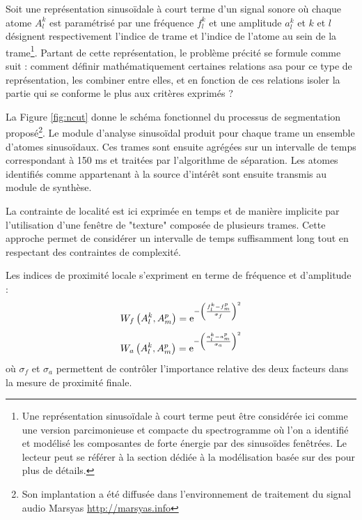 Soit une représentation sinusoïdale à court terme d'un signal sonore où chaque atome $A_l^k$ est paramétrisé par une fréquence $f_l^k$ et une amplitude $a_l^k$ et $k$ et $l$ désignent respectivement l'indice de trame et l'indice de l'atome au sein de la trame\footnote{Une représentation sinusoïdale à court terme peut être considérée ici comme une version parcimonieuse et compacte du spectrogramme où l'on a identifié et modélisé les composantes de forte énergie par des sinusoïdes fenêtrées. Le lecteur peut se référer à la section dédiée à la modélisation basée sur des   pour plus de détails.}. Partant de cette représentation, le problème précité se formule comme suit : comment définir mathématiquement certaines relations asa pour ce type de représentation, les combiner entre elles, et en fonction de ces relations isoler la partie qui se conforme le plus aux critères exprimés ?

La Figure \ref{fig:ncut} donne le schéma fonctionnel du processus de segmentation proposé\footnote{Son implantation a été diffusée dans l'environnement de traitement du signal audio Marsyas \url{http://marsyas.info}}. Le module d'analyse sinusoïdal produit pour chaque trame un ensemble d'atomes sinusoïdaux. Ces trames sont ensuite agrégées sur un intervalle de temps correspondant à 150 ms et traitées par l'algorithme de séparation. Les atomes identifiés comme appartenant à la source d'intérêt sont ensuite transmis au module de synthèse.

La contrainte de localité est ici exprimée en temps et de manière implicite par l'utilisation d'une fenêtre de "texture" composée de plusieurs trames. Cette approche permet de considérer un intervalle de temps suffisamment long tout en respectant des contraintes de complexité.

Les indices de proximité locale s'expriment en terme de fréquence et d'amplitude :
\begin{equation}
  W_f \left( A _ { l } ^ { k } , A _ { m } ^ { p } \right) = \operatorname{e} ^ { - \left( \frac { f _ { l } ^ { k } - f _ { m } ^ { p } } { \sigma _ { f } } \right) ^ { 2 } }
\end{equation}
\begin{equation}
  W_a \left( A _ { l } ^ { k } , A _ { m } ^ { p } \right) = \operatorname{e} ^{ - \left( \frac { a _ { l } ^ { k } - a _ { m } ^ { p } } { \sigma _ { a } } \right) ^ { 2 } }
\end{equation}
où $\sigma _ { f }$ et $\sigma _ { a }$ permettent de contrôler l'importance relative des deux facteurs dans la mesure de proximité finale.

